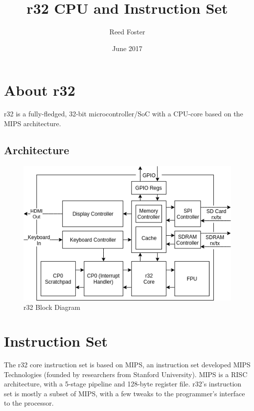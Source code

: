 \documentclass{article}
\begin{document}
\begin{titlepage}

\title{r32 CPU and Instruction Set}
\author{Reed Foster}
\date{June 2017}
\maketitle
\thispagestyle{empty}

\end{titlepage}

\tableofcontents

\newpage

\section*{About r32}
r32 is a fully-fledged, 32-bit microcontroller/SoC with a CPU-core based on the MIPS architecture.
\subsection*{Architecture}

\begin{figure}[h]
\caption{r32 Block Diagram}
\label{fig:r32blockdiagram}
\centering
\includegraphics[scale=0.7]{architecture.png}
\end{figure}

\newpage

\setcounter{page}{1}

\section{Instruction Set}
The r32 core instruction set is based on MIPS, an instruction set developed MIPS Technologies (founded by researchers from Stanford University). MIPS is a RISC architecture, with a 5-stage pipeline and 128-byte register file. r32's instruction set is mostly a subset of MIPS, with a few tweaks to the programmer's interface to the processor.
\end{document}
